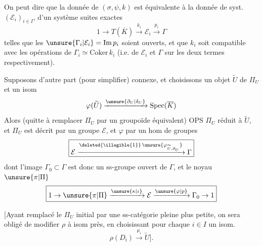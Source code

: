 
On peut dire que la donnée de $(\sigma,\psi,k)$ est équivalente
à la donnée de syst. $(\mathcal E_i)_{i\in I}$, d'un système
  suites exactes
\[
\boxed{1\to T(\overline K)\xrightarrow{k_i}\mathcal E_i
\xrightarrow{p_i}\Gamma}
\]
telles que les $\unsure{\Gamma_i|\mathcal E_i}
=\mathrm{Im}\,p_i$ soient ouverts, et que $k_i$ soit compatible
avec les opérations de $\Gamma_i\simeq\mathrm{Coker}\,k_i$
(i.e. de $\mathcal E_i$ et $\Gamma$ sur les deux termes respectivement).



Supposons d'autre part (pour simplifier)
 connexe,
et choisissons un objet $\widetilde U$ de $\Pi_U$ et un isom
\[
\varphi(\widetilde U)\xrightarrow{\unsure{\partial_U|\delta_U}}
\mathrm{Spec}(\overline K)
\]
Alors (quitte à remplacer $\Pi_U$ par un groupoïde équivalent)
OPS $\Pi_U$ réduit à $\widetilde U$, et $\Pi_U$ est décrit par
un groupe $\mathcal E$, et $\varphi$ par un hom de groupes
\[
\boxed{\mathcal E
\xrightarrow{\deleted{\illegible{1}}\,\unsure{\varphi_{\widetilde U,\partial_U}}}
\Gamma}
\]
dont l'image $\Gamma_0\subset\Gamma$ est donc un ss-groupe ouvert
de $\Gamma$, et le noyau  $\unsure{\pi|\Pi}$
\[
\boxed{1\to\unsure{\pi|\Pi}\xrightarrow{\unsure{\kappa|\iota}}\mathcal E
\xrightarrow{\unsure{\varphi|p}}\Gamma_0\to1}
\]


[Ayant remplacé le $\Pi_U$ initial par une ss-catégorie pleine
plus petite, on sera obligé de modifier $\rho$ à isom près,
 en choisissant pour chaque $i\in I$ un isom.
\[
\rho(D_i)\xrightarrow{\mu_i}\widetilde U].
\]

